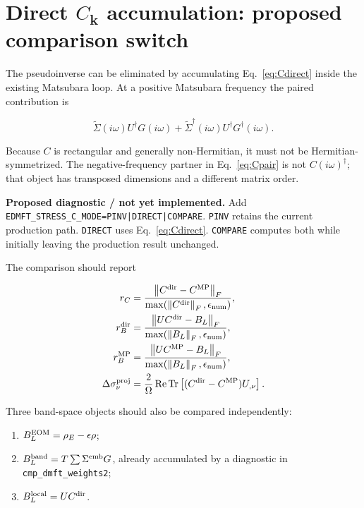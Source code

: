 \documentclass[11pt]{article}
\numberwithin{equation}{section}
\newcommand{\Tr}{\operatorname{Tr}}
\newcommand{\Ree}{\operatorname{Re}}
\newcommand{\kb}{\mathbf k}
\newcommand{\Sig}{\widetilde\Sigma}
\newcommand{\norm}[1]{\left\lVert #1\right\rVert}
\newcommand{\code}[1]{\texttt{#1}}
\newcommand{\status}[2]{\par\medskip\noindent\colorbox{#1}{\parbox{0.965\linewidth}{#2}}\par\medskip}
\newcommand{\proposed}[1]{\status{lightamber}{\textbf{Proposed diagnostic / not yet implemented.} #1}}
\begin{document}
\section{Direct $C_{\kb}$ accumulation: proposed comparison switch}

The pseudoinverse can be eliminated by accumulating Eq.~\eqref{eq:Cdirect}
inside the existing Matsubara loop.  At a positive Matsubara frequency the
paired contribution is

\begin{equation}
 \Sig(i\omega)U^\dagger G(i\omega)
 +\Sig^\dagger(i\omega)U^\dagger G^\dagger(i\omega).
 \label{eq:Cpair}
\end{equation}

Because $C$ is rectangular and generally non-Hermitian, it must not be
Hermitian-symmetrized.  The negative-frequency partner in
Eq.~\eqref{eq:Cpair} is not $C(i\omega)^\dagger$; that object has transposed
dimensions and a different matrix order.

\proposed{Add
\code{EDMFT\_STRESS\_C\_MODE=PINV|DIRECT|COMPARE}.  \code{PINV} retains the
current production path.  \code{DIRECT} uses Eq.~\eqref{eq:Cdirect}.
\code{COMPARE} computes both while initially leaving the production result
unchanged.}

The comparison should report

\begin{align}
 r_C&=\frac{\norm{C^{\rm dir}-C^{\rm MP}}_F}
 {\max(\norm{C^{\rm dir}}_F,\epsilon_{\rm num})},\\
 r_B^{\rm dir}&=\frac{\norm{UC^{\rm dir}-B_L}_F}
 {\max(\norm{B_L}_F,\epsilon_{\rm num})},\\
 r_B^{\rm MP}&=\frac{\norm{UC^{\rm MP}-B_L}_F}
 {\max(\norm{B_L}_F,\epsilon_{\rm num})},\\
 \Delta\sigma_\nu^{\rm proj}
 &=\frac{2}{\Omega}\Ree\Tr\left[
 (C^{\rm dir}-C^{\rm MP})U_{,\nu}\right].
 \label{eq:Cdiagnostics}
\end{align}

Three band-space objects should also be compared independently:

\begin{enumerate}
\item $B_L^{\rm EOM}=\rho_E-\epsilon\rho$;
\item $B_L^{\rm band}=T\sum\Sigma^{\rm emb}G$, already accumulated by a
      diagnostic in \code{cmp\_dmft\_weights2};
\item $B_L^{\rm local}=UC^{\rm dir}$.
\end{enumerate}
\end{document}
